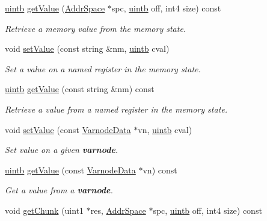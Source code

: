 \begin{DoxyCompactItemize}
\mbox{\hyperlink{types_8h_a2db313c5d32a12b01d26ac9b3bca178f}{uintb}} \mbox{\hyperlink{class_memory_state_ae4d10a6ac34ebd96017915c5b6a39375}{get\+Value}} (\mbox{\hyperlink{class_addr_space}{Addr\+Space}} $\ast$spc, \mbox{\hyperlink{types_8h_a2db313c5d32a12b01d26ac9b3bca178f}{uintb}} off, int4 size) const
\begin{DoxyCompactList}\small\item\em Retrieve a memory value from the memory state. \end{DoxyCompactList}\item 
void \mbox{\hyperlink{class_memory_state_aec6679949faa142792307fee30506512}{set\+Value}} (const string \&nm, \mbox{\hyperlink{types_8h_a2db313c5d32a12b01d26ac9b3bca178f}{uintb}} cval)
\begin{DoxyCompactList}\small\item\em Set a value on a named register in the memory state. \end{DoxyCompactList}\item 
\mbox{\hyperlink{types_8h_a2db313c5d32a12b01d26ac9b3bca178f}{uintb}} \mbox{\hyperlink{class_memory_state_af9ec8f86ed75b9b2f57c3351951ce5b1}{get\+Value}} (const string \&nm) const
\begin{DoxyCompactList}\small\item\em Retrieve a value from a named register in the memory state. \end{DoxyCompactList}\item 
void \mbox{\hyperlink{class_memory_state_a9ec71816b195b33524214f82651a99cd}{set\+Value}} (const \mbox{\hyperlink{struct_varnode_data}{Varnode\+Data}} $\ast$vn, \mbox{\hyperlink{types_8h_a2db313c5d32a12b01d26ac9b3bca178f}{uintb}} cval)
\begin{DoxyCompactList}\small\item\em Set value on a given {\bfseries{varnode}}. \end{DoxyCompactList}\item 
\mbox{\hyperlink{types_8h_a2db313c5d32a12b01d26ac9b3bca178f}{uintb}} \mbox{\hyperlink{class_memory_state_a9b0f55b9ff7e228fd09e0b550e8479f2}{get\+Value}} (const \mbox{\hyperlink{struct_varnode_data}{Varnode\+Data}} $\ast$vn) const
\begin{DoxyCompactList}\small\item\em Get a value from a {\bfseries{varnode}}. \end{DoxyCompactList}\item 
void \mbox{\hyperlink{class_memory_state_ab8ea70436398ce942b25366b71b26506}{get\+Chunk}} (uint1 $\ast$res, \mbox{\hyperlink{class_addr_space}{Addr\+Space}} $\ast$spc, \mbox{\hyperlink{types_8h_a2db313c5d32a12b01d26ac9b3bca178f}{uintb}} off, int4 size) const

\end{DoxyCompactItemize}
